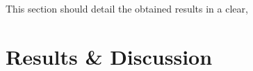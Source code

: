


This section should detail the obtained results in a clear,
%
% 
%

\section{Results \& Discussion}
